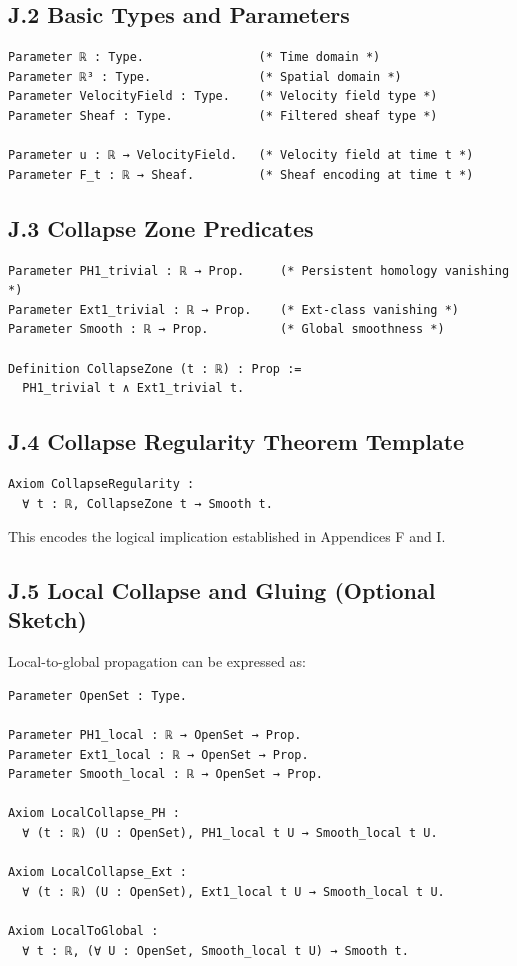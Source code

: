 \documentclass[11pt]{article}
\begin{document}
\subsection*{J.2 Basic Types and Parameters}

\begin{lstlisting}[language=Coq]
Parameter ℝ : Type.                (* Time domain *)
Parameter ℝ³ : Type.               (* Spatial domain *)
Parameter VelocityField : Type.    (* Velocity field type *)
Parameter Sheaf : Type.            (* Filtered sheaf type *)

Parameter u : ℝ → VelocityField.   (* Velocity field at time t *)
Parameter F_t : ℝ → Sheaf.         (* Sheaf encoding at time t *)
\end{lstlisting}

\subsection*{J.3 Collapse Zone Predicates}

\begin{lstlisting}[language=Coq]
Parameter PH1_trivial : ℝ → Prop.     (* Persistent homology vanishing *)
Parameter Ext1_trivial : ℝ → Prop.    (* Ext-class vanishing *)
Parameter Smooth : ℝ → Prop.          (* Global smoothness *)

Definition CollapseZone (t : ℝ) : Prop :=
  PH1_trivial t ∧ Ext1_trivial t.
\end{lstlisting}

\subsection*{J.4 Collapse Regularity Theorem Template}

\begin{lstlisting}[language=Coq]
Axiom CollapseRegularity :
  ∀ t : ℝ, CollapseZone t → Smooth t.
\end{lstlisting}

This encodes the logical implication established in Appendices F and I.

\subsection*{J.5 Local Collapse and Gluing (Optional Sketch)}

Local-to-global propagation can be expressed as:

\begin{lstlisting}[language=Coq]
Parameter OpenSet : Type.

Parameter PH1_local : ℝ → OpenSet → Prop.
Parameter Ext1_local : ℝ → OpenSet → Prop.
Parameter Smooth_local : ℝ → OpenSet → Prop.

Axiom LocalCollapse_PH :
  ∀ (t : ℝ) (U : OpenSet), PH1_local t U → Smooth_local t U.

Axiom LocalCollapse_Ext :
  ∀ (t : ℝ) (U : OpenSet), Ext1_local t U → Smooth_local t U.

Axiom LocalToGlobal :
  ∀ t : ℝ, (∀ U : OpenSet, Smooth_local t U) → Smooth t.
\end{lstlisting}
\end{document}
